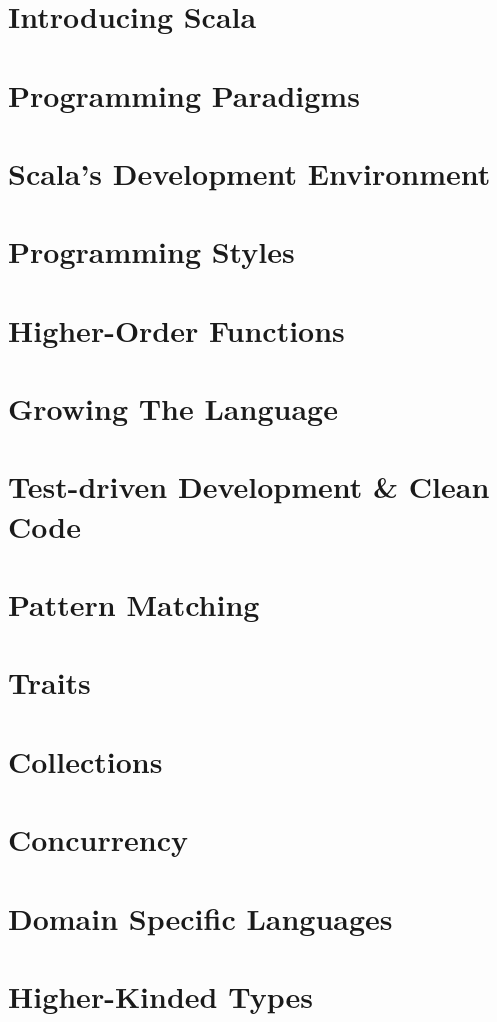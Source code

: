 \part[Introducing Scala]{Introducing Scala}
\part[Programming Paradigms]{Programming Paradigms}
\part[Scala's Development Environment]{Scala's Development Environment}
\part[Programming Styles]{Programming Styles}
\part[Higher-Order Functions]{Higher-Order Functions}
\part[Growing The Language]{Growing The Language}
\part[TDD \& Clean Code]{Test-driven Development \& Clean Code}
\part[Pattern Matching]{Pattern Matching}
\part[Traits]{Traits}
\part[Collections]{Collections}
\part[Concurrency]{Concurrency}
\part[DSLs]{Domain Specific Languages}
\part[Higher-Kinded Types]{Higher-Kinded Types}
